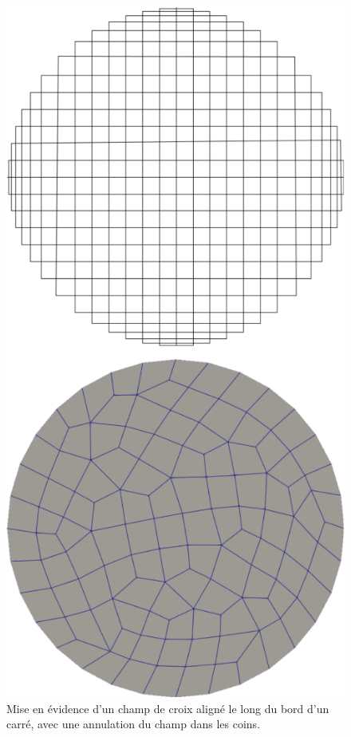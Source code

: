 \begin{figure}[h!]
  \centering
  \includegraphics[scale=0.32]{images/align_bord.pdf}
  \caption{Mise en évidence d'un champ de croix aligné le long du bord d'un carré, avec une annulation du champ dans les coins.}
  \label{fig:align_bord}
\end{figure}

